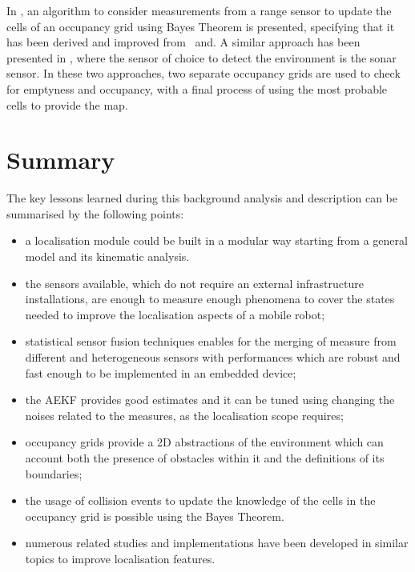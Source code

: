 In \cite{joubert2012adaptive}, an algorithm to consider measurements from a range sensor to update the cells of an occupancy grid using Bayes Theorem is presented, specifying that it has been derived and improved from~\cite{12145} and\cite{thrun_probabilistic_2005}.
A similar approach has been presented in \cite{singh_sonar_2019}, where the sensor of choice to detect the environment is the sonar sensor. 
In these two approaches, two separate occupancy grids are used to check for emptyness and occupancy, with a final process of using the most probable cells to provide the map.



\section{Summary}

\noindent The key lessons learned during this background analysis and description can be summarised by the following points:
\begin{itemize}
    \item a localisation module could be built in a modular way starting from a general model and its kinematic analysis.%
    \item the sensors available, which do not require an external infrastructure installations, are enough to measure enough phenomena to cover the states needed to improve the localisation aspects of a mobile robot;
    \item statistical sensor fusion techniques enables for the merging of measure from different and heterogeneous sensors with performances which are robust and fast enough to be implemented in an embedded device;
    \item the \gls{AEKF} provides good estimates and it can be tuned using changing the noises related to the measures, as the localisation scope requires;
    \item occupancy grids provide a \gls{2D} abstractions of the environment which can account both the presence of obstacles within it and the definitions of its boundaries;
    \item the usage of collision events to update the knowledge of the cells in the occupancy grid is possible using the Bayes Theorem.
    \item numerous related studies and implementations have been developed in similar topics to improve localisation features.%
\end{itemize}



\cleardoublepage
